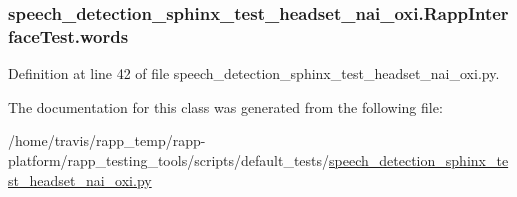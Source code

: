 \hypertarget{classspeech__detection__sphinx__test__headset__nai__oxi_1_1RappInterfaceTest_a3b6649e75cca230249f320b12bd81313}{
\subsubsection[{words}]{\setlength{\rightskip}{0pt plus 5cm}speech\-\_\-detection\-\_\-sphinx\-\_\-test\-\_\-headset\-\_\-nai\-\_\-oxi.\-Rapp\-Interface\-Test.\-words}}\label{classspeech__detection__sphinx__test__headset__nai__oxi_1_1RappInterfaceTest_a3b6649e75cca230249f320b12bd81313}


Definition at line 42 of file speech\-\_\-detection\-\_\-sphinx\-\_\-test\-\_\-headset\-\_\-nai\-\_\-oxi.\-py.



The documentation for this class was generated from the following file\-:\begin{DoxyCompactItemize}
\item 
/home/travis/rapp\-\_\-temp/rapp-\/platform/rapp\-\_\-testing\-\_\-tools/scripts/default\-\_\-tests/\hyperlink{speech__detection__sphinx__test__headset__nai__oxi_8py}{speech\-\_\-detection\-\_\-sphinx\-\_\-test\-\_\-headset\-\_\-nai\-\_\-oxi.\-py}\end{DoxyCompactItemize}
